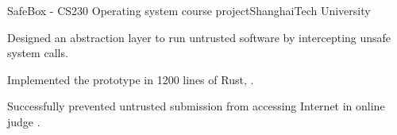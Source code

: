 \renewcommand{\timeInterval}{\DTMdisplaydate{2017}{6}{28}{-1} - }

\ifx\lang\eng
	\begin{rSubsection}{SafeBox}{\timeInterval}{CS230 Operating system course project}{ShanghaiTech University}
		\item Designed an abstraction layer to run untrusted software by intercepting unsafe system calls.
		\item Implemented the prototype in 1200 lines of Rust, .
		\item Successfully prevented untrusted submission from accessing Internet in online judge .
	\end{rSubsection}
\fi

\renewcommand{\timeInterval}{}
